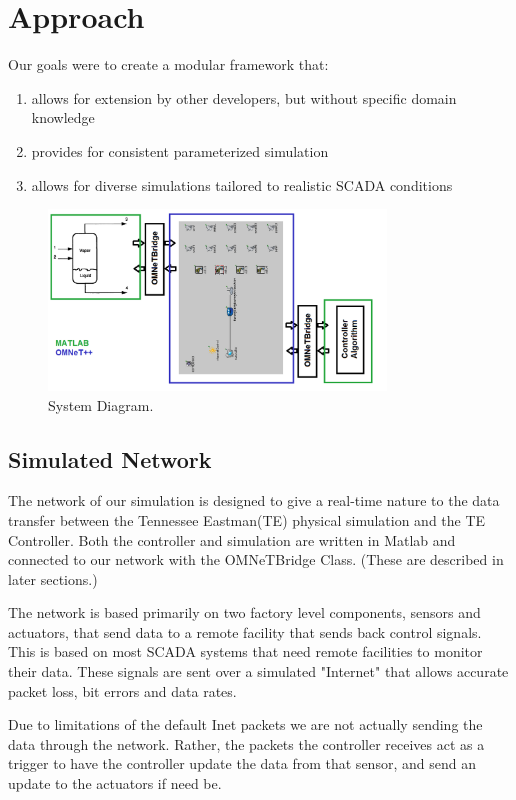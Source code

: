 \section{Approach}
Our goals were to create a modular framework that:
\begin{enumerate}
\item allows for extension by other developers, but without specific domain knowledge
\item provides for consistent parameterized simulation
\item allows for diverse simulations tailored to realistic SCADA conditions
\end{enumerate}


\begin{figure}
        \centering
		\includegraphics[width=0.8\textwidth]{figs/system.png}
        \caption{System Diagram.}
        \label{fig:system}        
\end{figure}


\subsection{Simulated Network}

The network of our simulation is designed to give a real-time nature to the data transfer between the Tennessee Eastman(TE) physical simulation and the TE Controller. Both the controller and simulation are written in Matlab and connected to our network with the OMNeTBridge Class. (These are described in later sections.)

The network is based primarily on two factory level components, sensors and actuators, that send data to a remote facility that sends back control signals. This is based on most SCADA systems that need remote facilities to monitor their data. These signals are sent over a simulated "Internet" that allows accurate packet loss, bit errors and data rates. 

Due to limitations of the default Inet packets we are not actually sending the data through the network. Rather, the packets the controller receives act as a trigger to have the controller update the data from that sensor, and send an update to the actuators if need be. 

